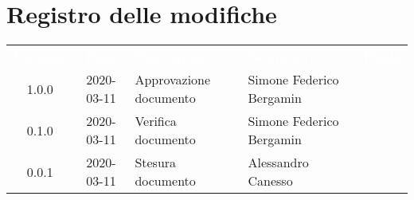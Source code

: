 \section*{Registro delle modifiche}
{
	\centering
	\begin{longtable}{ c c  C{4cm}  C{4cm}  C{3cm} }
		\textcolor{white}{\textbf{Versione}} & \textcolor{white}{\textbf{Data}} & \textcolor{white}{\textbf{Descrizione}} & \textcolor{white}{\textbf{Nominativo}} & \textcolor{white}{\textbf{Ruolo}}\\		
		1.0.0 & 2020-03-11 & Approvazione documento & Simone Federico Bergamin &\RdP{}\\		
		0.1.0 & 2020-03-11 & Verifica documento & Simone Federico Bergamin &\ver{}\\		
		0.0.1 & 2020-03-11 & Stesura documento & Alessandro Canesso &\reda{}\\		
		
	\end{longtable}

}